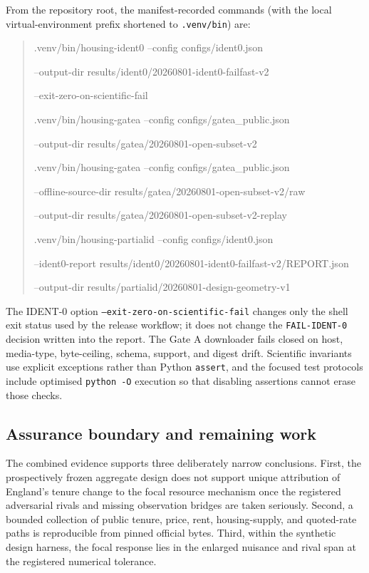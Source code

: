 From the repository root, the manifest-recorded commands (with the local
virtual-environment prefix shortened to \texttt{.venv/bin}) are:

\begin{quote}
\footnotesize\ttfamily
.venv/bin/housing-ident0 --config configs/ident0.json\par
\quad --output-dir results/ident0/20260801-ident0-failfast-v2\par
\quad --exit-zero-on-scientific-fail\par\medskip
.venv/bin/housing-gatea --config configs/gatea\_public.json\par
\quad --output-dir results/gatea/20260801-open-subset-v2\par\medskip
.venv/bin/housing-gatea --config configs/gatea\_public.json\par
\quad --offline-source-dir results/gatea/20260801-open-subset-v2/raw\par
\quad --output-dir results/gatea/20260801-open-subset-v2-replay\par\medskip
.venv/bin/housing-partialid --config configs/ident0.json\par
\quad --ident0-report results/ident0/20260801-ident0-failfast-v2/REPORT.json\par
\quad --output-dir results/partialid/20260801-design-geometry-v1
\end{quote}

The IDENT-0 option \texttt{--exit-zero-on-scientific-fail} changes only the
shell exit status used by the release workflow; it does not change the
\texttt{FAIL-IDENT-0} decision written into the report.  The Gate A downloader
fails closed on host, media-type, byte-ceiling, schema, support, and digest
drift.  Scientific invariants use explicit exceptions rather than Python
\texttt{assert}, and the focused test protocols include optimised
\texttt{python -O} execution so that disabling assertions cannot erase those
checks.

\subsection{Assurance boundary and remaining work}
\label{sec:assurance-boundary}

The combined evidence supports three deliberately narrow conclusions.  First,
the prospectively frozen aggregate design does not support unique attribution of
England's tenure change to the focal resource mechanism once the registered
adversarial rivals and missing observation bridges are taken seriously.
Second, a bounded collection of public tenure, price, rent, housing-supply, and
quoted-rate paths is reproducible from pinned official bytes.  Third, within
the synthetic design harness, the focal response lies in the enlarged nuisance
and rival span at the registered numerical tolerance.

